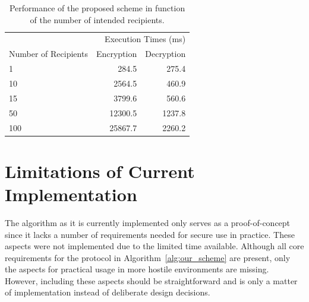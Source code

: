 \begin{table}
  \centering
  \begin{tabular}{@{}lrr@{}} \toprule
    \multicolumn{3}{r}{Execution Times (ms)} \\ \cmidrule(r){2-3}
    Number of Recipients & Encryption & Decryption \\ \midrule
    1 & 284.5 & 275.4  \\
    10 & 2564.5  & 460.9  \\
    15 & 3799.6  & 560.6  \\
    50 & 12300.5  & 1237.8  \\
    100 & 25867.7  & 2260.2  \\  \bottomrule
  \end{tabular}
  \caption{Performance of the proposed scheme in function of the number of intended recipients.}
  \label{table:performance_of_proposed_scheme}
\end{table}

\section{Limitations of Current Implementation}
The algorithm as it is currently implemented only serves as a proof-of-concept since it lacks a number of requirements needed for secure use in practice. These aspects were not implemented due to the limited time available. Although all core requirements for the protocol in Algorithm~\ref{alg:our_scheme} are present, only the aspects for practical usage in more hostile environments are missing. However, including these aspects should be straightforward and is only a matter of implementation instead of deliberate design decisions.

